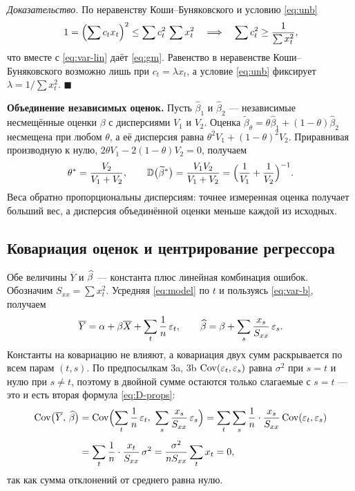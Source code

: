 \emph{Доказательство.} По неравенству Коши--Буняковского и условию \eqref{eq:unb}
\[
  1 = \Bigl(\sum c_tx_t\Bigr)^2 \le \sum c_t^2\,\sum x_t^2
  \quad\Longrightarrow\quad
  \sum c_t^2 \ge \frac{1}{\sum x_t^2},
\]
что вместе с \eqref{eq:var-lin} даёт \eqref{eq:gm}. Равенство в неравенстве
Коши--Буняковского возможно лишь при $c_t = \lambda x_t$, а условие
\eqref{eq:unb} фиксирует $\lambda = 1\big/\sum x_t^2$. $\blacksquare$

\textbf{Объединение независимых оценок.} Пусть $\widehat{\beta}_1$ и
$\widehat{\beta}_2$ — независимые несмещённые оценки $\beta$ с дисперсиями $V_1$
и $V_2$. Оценка
$\widetilde{\beta}_\theta = \theta\widehat{\beta}_1 + (1-\theta)\widehat{\beta}_2$
несмещена при любом $\theta$, а её дисперсия равна
$\theta^2V_1 + (1-\theta)^2V_2$. Приравнивая производную к нулю,
$2\theta V_1 - 2(1-\theta)V_2 = 0$, получаем
\begin{equation}
  \theta^{*} = \frac{V_2}{V_1 + V_2},
  \qquad
  \mathbb{D}\bigl(\widetilde{\beta}^{*}\bigr) = \frac{V_1V_2}{V_1 + V_2}
  = \Bigl(\frac{1}{V_1} + \frac{1}{V_2}\Bigr)^{-1} .
  \label{eq:pool}
\end{equation}
Веса обратно пропорциональны дисперсиям: точнее измеренная оценка получает
больший вес, а дисперсия объединённой оценки меньше каждой из исходных.

\subsection{Ковариация оценок и центрирование регрессора}\label{sec:cov}

Обе величины $\overline{Y}$ и $\widehat{\beta}$ — константа плюс линейная комбинация
ошибок. Обозначим $S_{xx} = \sum x_t^2$. Усредняя \eqref{eq:model} по $t$ и
пользуясь \eqref{eq:var-b}, получаем
\[
  \overline{Y} = \alpha + \beta\overline{X} + \sum_t \frac{1}{n}\,\varepsilon_t,
  \qquad
  \widehat{\beta} = \beta + \sum_s \frac{x_s}{S_{xx}}\,\varepsilon_s .
\]
Константы на ковариацию не влияют, а ковариация двух сумм раскрывается по всем
парам $(t, s)$. По предпосылкам 3a, 3b $\mathrm{Cov}(\varepsilon_t, \varepsilon_s)$ равна
$\sigma^2$ при $s = t$ и нулю при $s \neq t$, поэтому в двойной сумме остаются
только слагаемые с $s = t$ — это и есть вторая формула \eqref{eq:D-props}:
\[
\begin{aligned}
  \mathrm{Cov}\bigl(\overline{Y},\, \widehat{\beta}\bigr)
  &= \mathrm{Cov}\Bigl(\sum_t \frac{1}{n}\,\varepsilon_t,\ \sum_s \frac{x_s}{S_{xx}}\,\varepsilon_s\Bigr)
   = \sum_t\sum_s \frac{1}{n}\cdot\frac{x_s}{S_{xx}}\,\mathrm{Cov}(\varepsilon_t, \varepsilon_s) \\[4pt]
  &= \sum_t \frac{1}{n}\cdot\frac{x_t}{S_{xx}}\,\sigma^2
   = \frac{\sigma^2}{n S_{xx}}\sum_t x_t = 0 ,
\end{aligned}
\]
так как сумма отклонений от среднего равна нулю.

